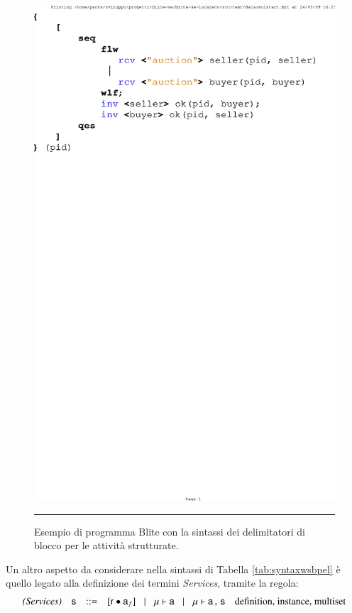 \begin{figure}[!t]
\begin{center}
  \includegraphics[scale=0.80,clip]{linguaggio/dia/blt1}
   \caption[Codice Blite, esempio delimitatori di blocco]{Esempio di programma
   Blite con la sintassi dei delimitatori di blocco per le attività
   strutturate.}
   \rule{7cm}{0.01cm}
  \label{fig:lin:blt1}
\end{center}
\end{figure}


Un altro aspetto da considerare nella sintassi di Tabella \ref{tab:syntaxwsbpel}
è quello legato alla definizione dei termini \textit{Services}, tramite la
regola:
$$
\begin{array}{rcccl}
\textit{(Services)} & {\sf s} & ::= &
[{\sf r} \bullet {\sf a}_f] \!\quad | \quad\!
{\sf \mu} \vdash {\sf a} \!\quad | \quad\!
{\sf \mu} \vdash {\sf a} \,,\, {\sf s} & \textrm{definition, instance,
multiset}
\end{array}
$$ 

